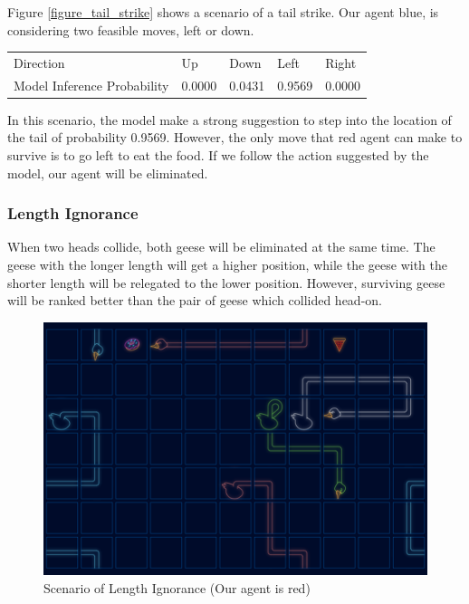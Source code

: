 Figure \ref{figure_tail_strike} shows a scenario of a tail strike. Our agent blue, is considering two feasible moves, left or down.

\begin{table}[h!]
\begin{tabular}{lllll}
Direction                   & Up     & Down   & Left   & Right  \\
Model Inference Probability & 0.0000 & 0.0431 & 0.9569 & 0.0000
\end{tabular}
\end{table}

In this scenario, the model make a strong suggestion to step into the location of the tail of probability 0.9569. However, the only move that red agent can make to survive is to go left to eat the food. If we follow the action suggested by the model, our agent will be eliminated.

\subsubsection{Length Ignorance}
\label{subsubsection_length_ignorance}

When two heads collide, both geese will be eliminated at the same time. The geese with the longer length will get a higher position, while the geese with the shorter length will be relegated to the lower position. However, surviving geese will be ranked better than the pair of geese which collided head-on.

\begin{figure}[h!]
\centering
\includegraphics[width=\textwidth]{images/scenario-length-ignorance.png}
\caption{Scenario of Length Ignorance (Our agent is red)}
\label{figure_length_ignorance}
\end{figure}

